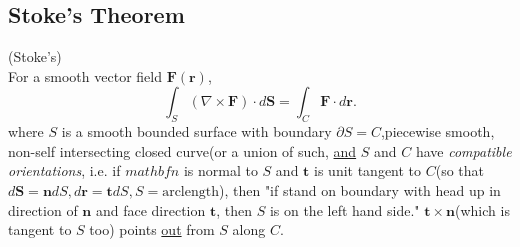 \documentclass[a4paper]{article}
\begin{document}
\subsection{Stoke's Theorem}
\begin{thm}(Stoke's)\\
	For a smooth vector field $\mathbf{F}\left(\mathbf{r}\right)$,\\
	\begin{equation*}
	\int_{S} \left(\nabla\times\mathbf{F}\right)\cdot d\mathbf{S} = \int_{C}\mathbf{F}\cdot d\mathbf{r}.
	\end{equation*}
	where $S$ is a smooth bounded surface with boundary $\partial S=C$,piecewise smooth, non-self intersecting closed curve(or a union of such, \underline{and} $S$ and $C$ have \emph{compatible orientations}, i.e. if $mathbf{n}$ is normal to $S$ and $\mathbf{t}$ is unit tangent to $C$(so that $d \mathbf{S}=\mathbf{n}dS, d \mathbf{r}=\mathbf{t}dS, S=\text{arclength}$), then "if stand on boundary with head up in direction of $\mathbf{n}$ and face direction $\mathbf{t}$, then $S$ is on the left hand side." $\mathbf{t}\times\mathbf{n}$(which is tangent to $S$ too) points \underline{out} from $S$ along $C$.
\end{thm}
\end{document}
